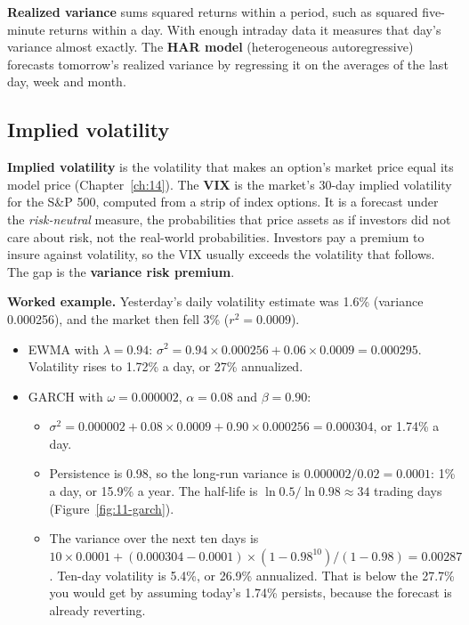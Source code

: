 \textbf{Realized variance} sums squared returns within a period, such as squared five-minute returns within a day. With enough intraday data it measures that day's variance almost exactly. The \textbf{HAR model} (heterogeneous autoregressive) forecasts tomorrow's realized variance by regressing it on the averages of the last day, week and month.

\subsection{Implied volatility}
\label{sec:11-iv}

\textbf{Implied volatility} is the volatility that makes an option's market price equal its model price (Chapter~\ref{ch:14}). The \textbf{VIX} is the market's 30-day implied volatility for the S\&P 500, computed from a strip of index options. It is a forecast under the \emph{risk-neutral} measure, the probabilities that price assets as if investors did not care about risk, not the real-world probabilities. Investors pay a premium to insure against volatility, so the VIX usually exceeds the volatility that follows. The gap is the \textbf{variance risk premium}.

\textbf{Worked example.} Yesterday's daily volatility estimate was 1.6\% (variance 0.000256), and the market then fell 3\% ($r^2 = 0.0009$).

\begin{itemize}
  \item EWMA with $\lambda = 0.94$: $\sigma^2 = 0.94 \times 0.000256 + 0.06 \times 0.0009 = 0.000295$. Volatility rises to 1.72\% a day, or 27\% annualized.
  \item GARCH with $\omega = 0.000002$, $\alpha = 0.08$ and $\beta = 0.90$:
  \begin{itemize}
    \item $\sigma^2 = 0.000002 + 0.08 \times 0.0009 + 0.90 \times 0.000256 = 0.000304$, or 1.74\% a day.
    \item Persistence is 0.98, so the long-run variance is $0.000002 / 0.02 = 0.0001$: 1\% a day, or 15.9\% a year. The half-life is $\ln 0.5 / \ln 0.98 \approx 34$ trading days (Figure~\ref{fig:11-garch}).
    \item The variance over the next ten days is $10 \times 0.0001 + (0.000304 - 0.0001) \times (1 - 0.98^{10})/(1 - 0.98) = 0.00287$. Ten-day volatility is 5.4\%, or 26.9\% annualized. That is below the 27.7\% you would get by assuming today's 1.74\% persists, because the forecast is already reverting.
  \end{itemize}
\end{itemize}

